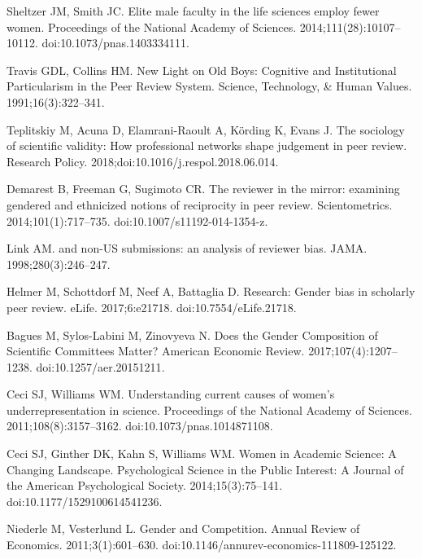 \documentclass[10pt,letterpaper]{article}
\begin{document}
\begin{thebibliography}{100}
Sheltzer JM, Smith JC.
\newblock Elite male faculty in the life sciences employ fewer women.
\newblock Proceedings of the National Academy of Sciences.
  2014;111(28):10107--10112.
\newblock doi:{10.1073/pnas.1403334111}.

Travis GDL, Collins HM.
\newblock New {Light} on {Old} {Boys}: {Cognitive} and {Institutional}
  {Particularism} in the {Peer} {Review} {System}.
\newblock Science, Technology, \& Human Values. 1991;16(3):322--341.

Teplitskiy M, Acuna D, Elamrani-Raoult A, K{\"o}rding K, Evans J.
\newblock The sociology of scientific validity: {How} professional networks
  shape judgement in peer review.
\newblock Research Policy. 2018;doi:{10.1016/j.respol.2018.06.014}.

Demarest B, Freeman G, Sugimoto CR.
\newblock The reviewer in the mirror: examining gendered and ethnicized notions
  of reciprocity in peer review.
\newblock Scientometrics. 2014;101(1):717--735.
\newblock doi:{10.1007/s11192-014-1354-z}.

Link AM.
 and non-{US} submissions: an analysis of reviewer bias.
\newblock JAMA. 1998;280(3):246--247.

Helmer M, Schottdorf M, Neef A, Battaglia D.
\newblock Research: {Gender} bias in scholarly peer review.
\newblock eLife. 2017;6:e21718.
\newblock doi:{10.7554/eLife.21718}.

Bagues M, Sylos-Labini M, Zinovyeva N.
\newblock Does the {Gender} {Composition} of {Scientific} {Committees}
  {Matter}?
\newblock American Economic Review. 2017;107(4):1207--1238.
\newblock doi:{10.1257/aer.20151211}.

Ceci SJ, Williams WM.
\newblock Understanding current causes of women's underrepresentation in
  science.
\newblock Proceedings of the National Academy of Sciences.
  2011;108(8):3157--3162.
\newblock doi:{10.1073/pnas.1014871108}.

Ceci SJ, Ginther DK, Kahn S, Williams WM.
\newblock Women in {Academic} {Science}: {A} {Changing} {Landscape}.
\newblock Psychological Science in the Public Interest: A Journal of the
  American Psychological Society. 2014;15(3):75--141.
\newblock doi:{10.1177/1529100614541236}.

Niederle M, Vesterlund L.
\newblock Gender and {Competition}.
\newblock Annual Review of Economics. 2011;3(1):601--630.
\newblock doi:{10.1146/annurev-economics-111809-125122}.


\end{thebibliography}
\end{document}

